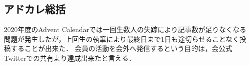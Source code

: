 \subsection*{アドカレ総括}



2020年度のAdvent Calendarでは一回生数人の失踪により記事数が足りなくなる問題が発生したが，上回生の執筆により最終日まで1日も途切らせることなく投稿することが出来た．
会員の活動を会外へ発信するという目的は，会公式Twitterでの共有より達成出来たと言える．